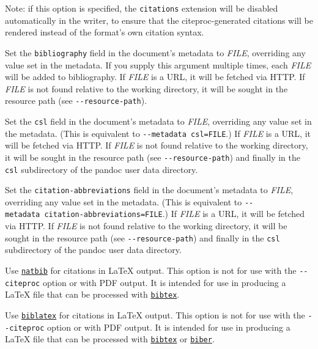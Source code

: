 \documentclass[
]{article}
\begin{document}
\begin{description}
Note: if this option is specified, the \texttt{citations} extension will
be disabled automatically in the writer, to ensure that the
citeproc-generated citations will be rendered instead of the format's
own citation syntax.
\item[\texttt{-\/-bibliography=}\emph{FILE}]
Set the \texttt{bibliography} field in the document's metadata to
\emph{FILE}, overriding any value set in the metadata. If you supply
this argument multiple times, each \emph{FILE} will be added to
bibliography. If \emph{FILE} is a URL, it will be fetched via HTTP. If
\emph{FILE} is not found relative to the working directory, it will be
sought in the resource path (see \texttt{-\/-resource-path}).
\item[\texttt{-\/-csl=}\emph{FILE}]
Set the \texttt{csl} field in the document's metadata to \emph{FILE},
overriding any value set in the metadata. (This is equivalent to
\texttt{-\/-metadata\ csl=FILE}.) If \emph{FILE} is a URL, it will be
fetched via HTTP. If \emph{FILE} is not found relative to the working
directory, it will be sought in the resource path (see
\texttt{-\/-resource-path}) and finally in the \texttt{csl} subdirectory
of the pandoc user data directory.
\item[\texttt{-\/-citation-abbreviations=}\emph{FILE}]
Set the \texttt{citation-abbreviations} field in the document's metadata
to \emph{FILE}, overriding any value set in the metadata. (This is
equivalent to \texttt{-\/-metadata\ citation-abbreviations=FILE}.) If
\emph{FILE} is a URL, it will be fetched via HTTP. If \emph{FILE} is not
found relative to the working directory, it will be sought in the
resource path (see \texttt{-\/-resource-path}) and finally in the
\texttt{csl} subdirectory of the pandoc user data directory.
\item[\texttt{-\/-natbib}]
Use \href{https://ctan.org/pkg/natbib}{\texttt{natbib}} for citations in
LaTeX output. This option is not for use with the \texttt{-\/-citeproc}
option or with PDF output. It is intended for use in producing a LaTeX
file that can be processed with
\href{https://ctan.org/pkg/bibtex}{\texttt{bibtex}}.
\item[\texttt{-\/-biblatex}]
Use \href{https://ctan.org/pkg/biblatex}{\texttt{biblatex}} for
citations in LaTeX output. This option is not for use with the
\texttt{-\/-citeproc} option or with PDF output. It is intended for use
in producing a LaTeX file that can be processed with
\href{https://ctan.org/pkg/bibtex}{\texttt{bibtex}} or
\href{https://ctan.org/pkg/biber}{\texttt{biber}}.
\end{description}
\end{document}
